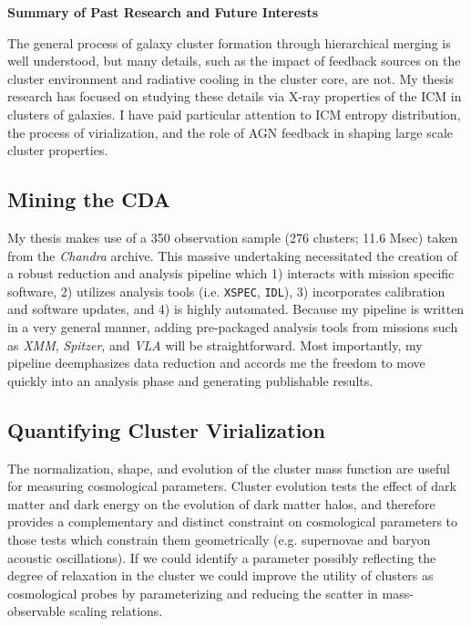 \documentclass[11pt]{article}
\begin{document}
\begin{center}
\textbf{Summary of Past Research and Future Interests}\\
\end{center}

The general process of galaxy cluster formation through hierarchical
merging is well understood, but many details, such as the impact of
feedback sources on the cluster environment and radiative cooling in
the cluster core, are not. My thesis research has focused on studying
these details via X-ray properties of the ICM in clusters of
galaxies. I have paid particular attention to ICM entropy
distribution, the process of virialization, and the role of AGN
feedback in shaping large scale cluster properties.

\subsection*{Mining the CDA}

My thesis makes use of a 350 observation sample (276 clusters; 11.6
Msec) taken from the {\it Chandra} archive. This massive
undertaking necessitated the creation of a robust reduction and
analysis pipeline which 1) interacts with mission specific software,
2) utilizes analysis tools (i.e. {\tt{XSPEC}}, {\tt{IDL}}), 3)
incorporates calibration and software updates, and 4) is highly
automated. Because my pipeline is written in a very general manner,
adding pre-packaged analysis tools from missions such as
{\textit{XMM}}, {\textit{Spitzer}}, and {\textit{VLA}} will be
straightforward. Most importantly, my pipeline deemphasizes data
reduction and accords me the freedom to move quickly into an analysis
phase and generating publishable results.

\subsection*{Quantifying Cluster Virialization}

The normalization, shape, and evolution of the cluster mass function
are useful for measuring cosmological parameters. Cluster evolution
tests the effect of dark matter and dark energy on the evolution of
dark matter halos, and therefore provides a complementary and
distinct constraint on cosmological parameters to those tests which
constrain them geometrically (e.g. supernovae and baryon acoustic
oscillations). If we could identify a parameter possibly reflecting
the degree of relaxation in the cluster we could improve the utility
of clusters as cosmological probes by parameterizing and reducing the
scatter in mass-observable scaling relations.
\end{document}
